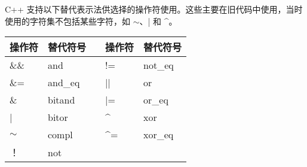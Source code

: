 
C++ 支持以下替代表示法供选择的操作符使用。这些主要在旧代码中使用，当时使用的字符集不包括某些字符，如 $\sim$、| 和 \^{}。

\begin{longtable}{|l|l|l|l|l|}
\hline
\textbf{操作符} & \textbf{替代符号} && \textbf{操作符} & \textbf{替代符号} \\ \hline
\endfirsthead
%
\endhead
%
\&\&   & and     && !=                  & not\_eq \\ \hline
\&=    & and\_eq && ||                  & or      \\ \hline
\&     & bitand  && |=                  & or\_eq  \\ \hline
|      & bitor   && \textasciicircum{}  & xor     \\ \hline
$\sim$ & compl   && \textasciicircum{}= & xor\_eq \\ \hline
！     & not     &&                     &         \\ \hline
\end{longtable}



